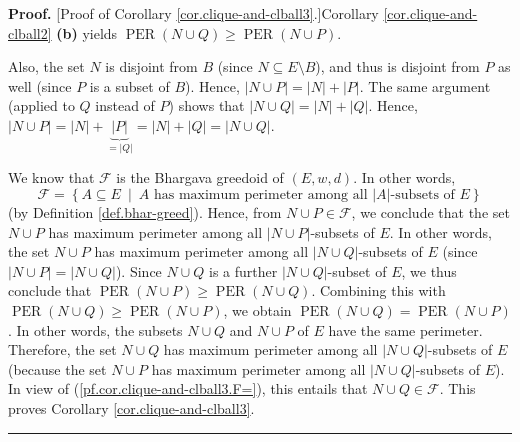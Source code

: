 \documentclass[numbers=enddot,12pt,final,onecolumn,notitlepage]{scrartcl}%
\theoremstyle{definition}
\newenvironment{proof}[1][Proof]{\noindent\textbf{#1.} }{\ \rule{0.5em}{0.5em}}
\renewcommand{\geq}{\geqslant}
\theoremstyle{plainsl}
\begin{document}
\begin{proof}
[Proof of Corollary \ref{cor.clique-and-clball3}.]Corollary
\ref{cor.clique-and-clball2} \textbf{(b)} yields $\operatorname*{PER}\left(
N\cup Q\right)  \geq\operatorname*{PER}\left(  N\cup P\right)  $.

Also, the set $N$ is disjoint from $B$ (since $N\subseteq E\setminus B$), and
thus is disjoint from $P$ as well (since $P$ is a subset of $B$). Hence,
$\left\vert N\cup P\right\vert =\left\vert N\right\vert +\left\vert
P\right\vert $. The same argument (applied to $Q$ instead of $P$) shows that
$\left\vert N\cup Q\right\vert =\left\vert N\right\vert +\left\vert
Q\right\vert $. Hence, $\left\vert N\cup P\right\vert =\left\vert N\right\vert
+\underbrace{\left\vert P\right\vert }_{=\left\vert Q\right\vert }=\left\vert
N\right\vert +\left\vert Q\right\vert =\left\vert N\cup Q\right\vert $.

We know that $\mathcal{F}$ is the Bhargava greedoid of $\left(  E,w,d\right)
$. In other words,
\begin{equation}
\mathcal{F}=\left\{  A\subseteq E\ \mid\ A\text{ has maximum perimeter among
all }\left\vert A\right\vert \text{-subsets of }E\right\}
\label{pf.cor.clique-and-clball3.F=}%
\end{equation}
(by Definition \ref{def.bhar-greed}). Hence, from $N\cup P\in\mathcal{F}$, we
conclude that the set $N\cup P$ has maximum perimeter among all $\left\vert
N\cup P\right\vert $-subsets of $E$. In other words, the set $N\cup P$ has
maximum perimeter among all $\left\vert N\cup Q\right\vert $-subsets of $E$
(since $\left\vert N\cup P\right\vert =\left\vert N\cup Q\right\vert $). Since
$N\cup Q$ is a further $\left\vert N\cup Q\right\vert $-subset of $E$, we thus
conclude that $\operatorname*{PER}\left(  N\cup P\right)  \geq
\operatorname*{PER}\left(  N\cup Q\right)  $. Combining this with
$\operatorname*{PER}\left(  N\cup Q\right)  \geq\operatorname*{PER}\left(
N\cup P\right)  $, we obtain $\operatorname*{PER}\left(  N\cup Q\right)
=\operatorname*{PER}\left(  N\cup P\right)  $. In other words, the subsets
$N\cup Q$ and $N\cup P$ of $E$ have the same perimeter. Therefore, the set
$N\cup Q$ has maximum perimeter among all $\left\vert N\cup Q\right\vert
$-subsets of $E$ (because the set $N\cup P$ has maximum perimeter among all
$\left\vert N\cup Q\right\vert $-subsets of $E$). In view of
(\ref{pf.cor.clique-and-clball3.F=}), this entails that $N\cup Q\in
\mathcal{F}$. This proves Corollary \ref{cor.clique-and-clball3}.
\end{proof}
\end{document}
